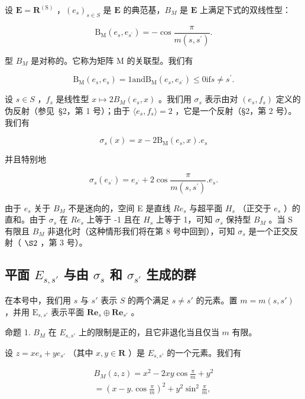 设 \(\mathbf{E} = \mathbf{R}^{(\mathrm{S})}\) ，\((e_s)_{s \in S}\) 是 \(\mathbf{E}\) 的典范基，\(B_M\) 是 \(\mathbf{E}\) 上满足下式的双线性型：

\[
\mathrm{B} _ {\mathrm{M}} (e _ {s}, e _ {s ^ {\prime}}) = - \cos \frac {\pi}{m (s , s ^ {\prime})}.
\]

型 \(B_{M}\) 是对称的。它称为矩阵 M 的关联型。我们有

\[
\mathrm{B} _ {\mathrm{M}} \left(e _ {s}, e _ {s}\right) = 1 \text {and} \mathrm{B} _ {\mathrm{M}} \left(e _ {s}, e _ {s ^ {\prime}}\right) \leqslant 0 \text {if} s \neq s ^ {\prime}.
\]

设 \(s \in S\) ，\(f_s\) 是线性型 \(x \mapsto 2B_M(e_s, x)\) 。我们用 \(\sigma_s\) 表示由对 \((e_s, f_s)\) 定义的伪反射（参见~§2，第 1 号）；由于 \(\langle e_s, f_s \rangle = 2\) ，它是一个反射（§2，第 2 号）。我们有

\[
\sigma_ {s} (x) = x - 2 \mathrm{B} _ {\mathrm{M}} (e _ {s}, x). e _ {s}
\]

并且特别地

\[
\sigma_ {s} (e _ {s ^ {\prime}}) = e _ {s ^ {\prime}} + 2 \cos \frac {\pi}{m (s , s ^ {\prime})}. e _ {s}.
\]

由于 \(e_{s}\) 关于 \(B_{M}\) 不是迷向的，空间 E 是直线 \(Re_{s}\) 与超平面 \(H_{s}\) （正交于 \(e_{s}\) ）的直和。由于 \(\sigma_{s}\) 在 \(Re_{s}\) 上等于 -1 且在 \(H_{s}\) 上等于 1，可知 \(\sigma_{s}\) 保持型 \(B_{M}\) 。当 S 有限且 \(B_{M}\) 非退化时（这种情形我们将在第 8 号中回到），可知 \(\sigma_{s}\) 是一个正交反射（ \(\S2\) ，第 3 号）。

\subsection{\texorpdfstring{平面 \(E_{s,s'}\) 与由 \(\sigma_{s}\) 和 \(\sigma_{s'}\) 生成的群}{平面 E\_s,s' 与由 sigma\_s 和 sigma\_s' 生成的群}}

在本号中，我们用 \(s\) 与 \(s'\) 表示 \(S\) 的两个满足 \(s \neq s'\) 的元素。置 \(m = m(s, s')\) ，并用 \(\mathrm{E}_{s,s'}\) 表示平面 \(\mathbf{Re}_s \oplus \mathbf{Re}_{s'}\) 。

命题 1. \(B_{M}\) 在 \(E_{s,s'}\) 上的限制是正的，且它非退化当且仅当 \(m\) 有限。

设 \(z = xe_{s} + ye_{s'}\) （其中 \(x, y \in \mathbf{R}\) ）是 \(E_{s,s'}\) 的一个元素。我们有

\[
\begin{array}{r} B _ {M} (z, z) = x ^ {2} - 2 x y \cos \frac {\pi}{m} + y ^ {2} \\ = (x - y. \cos \frac {\pi}{m}) ^ {2} + y ^ {2} \sin^ {2} \frac {\pi}{m}, \end{array}
\]

